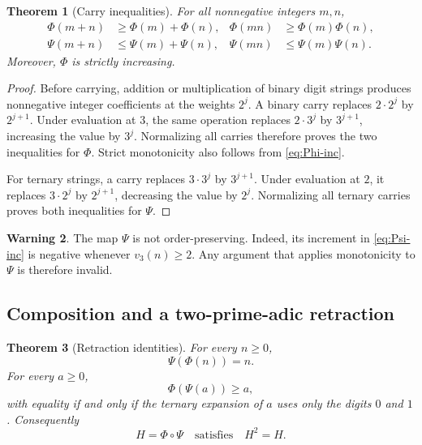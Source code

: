 \documentclass[11pt]{article}
\newtheorem{theorem}{Theorem}[section]
\theoremstyle{definition}
\newtheorem{warning}[theorem]{Warning}
\begin{document}
\begin{theorem}[Carry inequalities]\label{thm:carry-ineq}
For all nonnegative integers \(m,n\),
\begin{align}
 \Phi(m+n)&\ge\Phi(m)+\Phi(n),
 &\Phi(mn)&\ge\Phi(m)\Phi(n),\label{eq:Phi-super}\\
 \Psi(m+n)&\le\Psi(m)+\Psi(n),
 &\Psi(mn)&\le\Psi(m)\Psi(n).\label{eq:Psi-sub}
\end{align}
Moreover, \(\Phi\) is strictly increasing.
\end{theorem}

\begin{proof}
Before carrying, addition or multiplication of binary digit strings produces
nonnegative integer coefficients at the weights \(2^j\).  A binary carry
replaces \(2\cdot2^j\) by \(2^{j+1}\).  Under evaluation at \(3\), the same
operation replaces \(2\cdot3^j\) by \(3^{j+1}\), increasing the value by
\(3^j\).  Normalizing all carries therefore proves the two inequalities for
\(\Phi\).  Strict monotonicity also follows from \cref{eq:Phi-inc}.

For ternary strings, a carry replaces \(3\cdot3^j\) by \(3^{j+1}\).  Under
evaluation at \(2\), it replaces \(3\cdot2^j\) by \(2^{j+1}\), decreasing
the value by \(2^j\).  Normalizing all ternary carries proves both
inequalities for \(\Psi\).
\end{proof}

\begin{warning}
The map \(\Psi\) is not order-preserving.  Indeed, its increment in
\cref{eq:Psi-inc} is negative whenever \(v_3(n)\ge2\).  Any argument that
applies monotonicity to \(\Psi\) is therefore invalid.
\end{warning}

\subsection{Composition and a two-prime-adic retraction}

\begin{theorem}[Retraction identities]\label{thm:retraction}
For every \(n\ge0\),
\begin{equation}\label{eq:PsiPhi}
  \Psi(\Phi(n))=n.
\end{equation}
For every \(a\ge0\),
\begin{equation}\label{eq:PhiPsi-major}
  \Phi(\Psi(a))\ge a,
\end{equation}
with equality if and only if the ternary expansion of \(a\) uses only the
digits \(0\) and \(1\).  Consequently
\begin{equation}\label{eq:H-idem}
 H=\Phi\circ\Psi\quad\text{satisfies}\quad H^2=H.
\end{equation}
\end{theorem}
\end{document}
